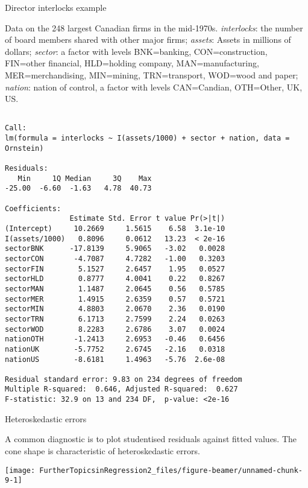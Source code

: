 \documentclass[10pt,ignorenonframetext,]{beamer}
\begin{document}
\begin{frame}[fragile]{Director interlocks example}

\tiny
Data on the 248 largest Canadian firms in the mid-1970s.
\emph{interlocks}: the number of board members shared with other major
firms; \emph{assets}: Assets in millions of dollars; \emph{sector}: a
factor with levels BNK=banking, CON=construction, FIN=other financial,
HLD=holding company, MAN=manufacturing, MER=merchandising, MIN=mining,
TRN=transport, WOD=wood and paper; \emph{nation}: nation of control, a
factor with levels CAN=Candian, OTH=Other, UK, US.

\begin{verbatim}

Call:
lm(formula = interlocks ~ I(assets/1000) + sector + nation, data = Ornstein)

Residuals:
   Min     1Q Median     3Q    Max 
-25.00  -6.60  -1.63   4.78  40.73 

Coefficients:
               Estimate Std. Error t value Pr(>|t|)
(Intercept)     10.2669     1.5615    6.58  3.1e-10
I(assets/1000)   0.8096     0.0612   13.23  < 2e-16
sectorBNK      -17.8139     5.9065   -3.02   0.0028
sectorCON       -4.7087     4.7282   -1.00   0.3203
sectorFIN        5.1527     2.6457    1.95   0.0527
sectorHLD        0.8777     4.0041    0.22   0.8267
sectorMAN        1.1487     2.0645    0.56   0.5785
sectorMER        1.4915     2.6359    0.57   0.5721
sectorMIN        4.8803     2.0670    2.36   0.0190
sectorTRN        6.1713     2.7599    2.24   0.0263
sectorWOD        8.2283     2.6786    3.07   0.0024
nationOTH       -1.2413     2.6953   -0.46   0.6456
nationUK        -5.7752     2.6745   -2.16   0.0318
nationUS        -8.6181     1.4963   -5.76  2.6e-08

Residual standard error: 9.83 on 234 degrees of freedom
Multiple R-squared:  0.646, Adjusted R-squared:  0.627 
F-statistic: 32.9 on 13 and 234 DF,  p-value: <2e-16
\end{verbatim}

\end{frame}

\begin{frame}{Heteroskedastic errors}

A common diagnostic is to plot studentised residuals against fitted
values. The cone shape is characteristic of heteroskedastic errors.

\begin{center}\texttt{[image: FurtherTopicsinRegression2\_files/figure-beamer/unnamed-chunk-9-1]} \end{center}

\end{frame}
\end{document}
